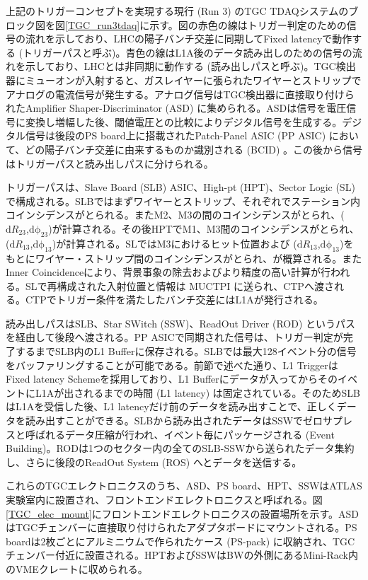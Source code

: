 上記のトリガーコンセプトを実現する現行 (Run 3) のTGC TDAQシステムのブロック図を図\ref{TGC_run3tdaq}に示す。図の赤色の線はトリガー判定のための信号の流れを示しており、LHCの陽子バンチ交差に同期してFixed latencyで動作する (トリガーパスと呼ぶ)。青色の線はL1A後のデータ読み出しのための信号の流れを示しており、LHCとは非同期に動作する (読み出しパスと呼ぶ)。TGC検出器にミューオンが入射すると、ガスレイヤーに張られたワイヤーとストリップでアナログの電流信号が発生する。アナログ信号はTGC検出器に直接取り付けられたAmplifier Shaper-Discriminator  (ASD) に集められる。ASDは信号を電圧信号に変換し増幅した後、閾値電圧との比較によりデジタル信号を生成する。デジタル信号は後段のPS board上に搭載されたPatch-Panel ASIC  (PP ASIC) において、どの陽子バンチ交差に由来するものか識別される  (BCID) 。この後から信号はトリガーパスと読み出しパスに分けられる。

トリガーパスは、Slave Board (SLB) ASIC、High-pt (HPT)、Sector Logic (SL) で構成される。SLBではまずワイヤーとストリップ、それぞれでステーション内コインシデンスがとられる。またM2、M3の間のコインシデンスがとられ、($\mathrm{d}R_{23}$,$\mathrm{d\phi_{23}}$)が計算される。その後HPTでM1、M3間のコインシデンスがとられ、($\mathrm{d}R_{13}$,$\mathrm{d\phi_{13}}$)が計算される。SLではM3におけるヒット位置および ($\mathrm{d}R_{13}$,$\mathrm{d\phi_{13}}$)をもとにワイヤー・ストリップ間のコインシデンスがとられ、\pt が概算される。またInner Coincidenceにより、背景事象の除去およびより精度の高い\pt 計算が行われる。SLで再構成された入射位置と\pt 情報は MUCTPI に送られ、CTPへ渡される。CTPでトリガー条件を満たしたバンチ交差にはL1Aが発行される。

読み出しパスはSLB、Star SWitch (SSW)、ReadOut Driver (ROD) というパスを経由して後段へ渡される。PP ASICで同期された信号は、トリガー判定が完了するまでSLB内のL1 Bufferに保存される。SLBでは最大128イベント分の信号をバッファリングすることが可能である。前節で述べた通り、L1 TriggerはFixed latency Schemeを採用しており、L1 Bufferにデータが入ってからそのイベントにL1Aが出されるまでの時間  (L1 latency) は固定されている。そのためSLBはL1Aを受信した後、L1 latencyだけ前のデータを読み出すことで、正しくデータを読み出すことができる。SLBから読み出されたデータはSSWでゼロサプレスと呼ばれるデータ圧縮が行われ、イベント毎にパッケージされる  (Event Building)。RODは1つのセクター内の全てのSLB-SSWから送られたデータ集約し、さらに後段のReadOut System  (ROS) へとデータを送信する。

これらのTGCエレクトロニクスのうち、ASD、PS board、HPT、SSWはATLAS実験室内に設置され、フロントエンドエレクトロニクスと呼ばれる。図\ref{TGC_elec_mount}にフロントエンドエレクトロニクスの設置場所を示す。ASDはTGCチェンバーに直接取り付けられたアダプタボードにマウントされる。PS boardは2枚ごとにアルミニウムで作られたケース  (PS-pack) に収納され、TGCチェンバー付近に設置される。HPTおよびSSWはBWの外側にあるMini-Rack内のVMEクレートに収められる。

